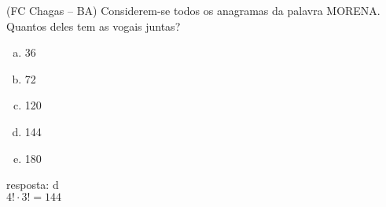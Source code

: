 \begin{ex}
  (FC Chagas – BA) Considerem-se todos os anagramas da palavra MORENA. Quantos deles tem as vogais juntas?
    \begin{enumerate}[(a)]
    \item 36
    \item 72
    \item 120
    \item 144
    \item 180
    \end{enumerate}
      \begin{sol}
        resposta: d \\
        $4!\cdot3!=144$
      \end{sol}
\end{ex}